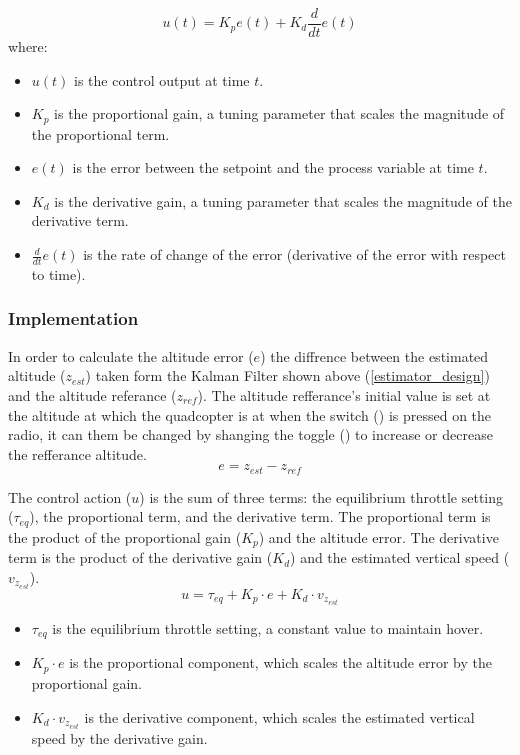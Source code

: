 \documentclass{article}
\begin{document}
\begin{equation}
  u(t) = K_p e(t) + K_d \frac{d}{dt} e(t)
\end{equation}
where:
\begin{itemize}
  \item $u(t)$ is the control output at time $t$.
  \item $K_p$ is the proportional gain, a tuning parameter that scales the magnitude of the proportional term.
  \item $e(t)$ is the error between the setpoint and the process variable at time $t$.
  \item $K_d$ is the derivative gain, a tuning parameter that scales the magnitude of the derivative term.
  \item $\frac{d}{dt} e(t)$ is the rate of change of the error (derivative of the error with respect to time).
\end{itemize}

\subsubsection*{Implementation}
In order to calculate the altitude error (\(e\)) the diffrence between the estimated altitude (\(z_{est}\)) taken form the Kalman Filter shown above (\ref{estimator_design}) and the altitude referance (\(z_{ref}\)). The altitude refferance's initial value is set at the altitude at which the quadcopter is 
at when the switch () is pressed on the radio, it can them be changed by shanging the toggle () to increase or decrease the refferance altitude.
\begin{equation}
  e = z_{est} - z_{ref}
\end{equation}

The control action (\(u\)) is the sum of three terms: the equilibrium throttle setting (\(\tau_{eq}\)), the proportional term, and the derivative term. The proportional term is the product of the proportional gain (\(K_p\)) and the altitude error. The derivative term is the product of the derivative gain
(\(K_d\)) and the estimated vertical speed (\(v_{z_{est}}\)).
\begin{equation}\label{PD_controller_eq}
  u = \tau_{eq} + K_p \cdot e + K_d \cdot v_{z_{est}}
\end{equation}
\begin{itemize}
  \item \(\tau_{eq}\) is the equilibrium throttle setting, a constant value to maintain hover.
  \item \(K_p \cdot e\) is the proportional component, which scales the altitude error by the proportional gain.
  \item \(K_d \cdot v_{z_{est}}\) is the derivative component, which scales the estimated vertical speed by the derivative gain.
\end{itemize}
\end{document}
